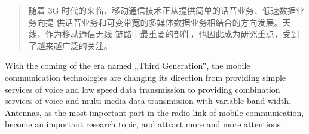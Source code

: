 \documentclass[UTF8,AutoFakeBold=1,AutoFakeSlant,zihao=-4,twoside]{cucthesis}
\begin{document}
\coverpage
\statement
\begin{abstract}
随着 3G 时代的来临，移动通信技术正从提供简单的话音业务、低速数据业务向提
供话音业务和可变带宽的多媒体数据业务相结合的方向发展。天线，作为移动通信无线
链路中最重要的部件，也因此成为研究重点，受到了越来越广泛的关注。

\end{abstract}

\begin{abstractEN}
With the coming of the era named „Third Generation‟, the mobile communication 
technologies are changing its direction from providing simple services of voice and low speed 
data transmission to providing combination services of voice and multi-media data 
transmission with variable band-width. Antennas, as the most important part in the radio link 
of mobile communication, become an important research topic, and attract more and more 
attentions.

\end{abstractEN}

\contentpage







\begin{references}
    
\end{references}

\end{document}
